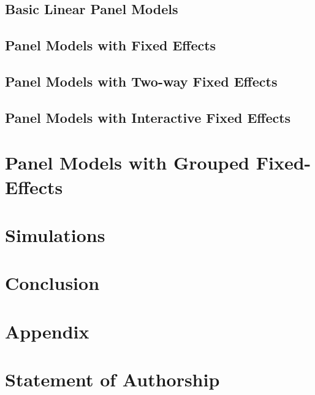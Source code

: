 \documentclass[paper=a4,oneside,DIV=8,fontsize=12pt, sectionentrydots=true]{scrartcl}
\theoremstyle{dotless}
\begin{document}
\subsection{Basic Linear Panel Models}\label{section:pols} %


\subsection{Panel Models with Fixed Effects}\label{Fixed Effects Model} %

\subsection{Panel Models with Two-way Fixed Effects} 

\subsection{Panel Models with Interactive Fixed Effects} 

\section{Panel Models with Grouped Fixed-Effects}\label{Grouped Fixed-Effects Model} %




\section{Simulations}\label{simulations}



\section{Conclusion}\label{conclusion}



\newpage

\printbibliography[heading=bibintoc,title={References}] 

\newpage

\setcounter{figure}{0} 
\renewcommand{\thefigure}{A.\arabic{figure}}
\setcounter{table}{0} 
\renewcommand{\thetable}{A.\arabic{table}}
\setcounter{equation}{0} \renewcommand{\theequation}{A.\arabic{equation}}
\setcounter{footnote}{0}

\renewcommand{\thesection}{A}
\section{Appendix}




\clearpage
\renewcommand{\thesection}{B}
\section{Statement of Authorship}

\end{document}
